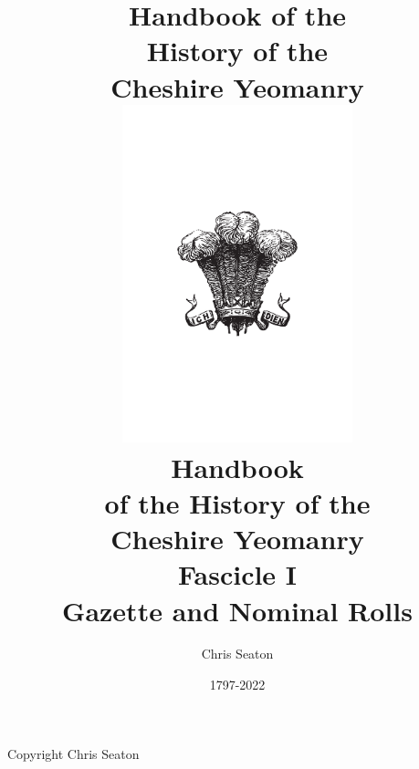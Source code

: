 \documentclass[a4paper,7pt]{book}
\title{Handbook of the \\ History of the \\ Cheshire Yeomanry}
\author{Chris Seaton}
\date{1797-2022}
\title{
  \includegraphics[width=0.5\textwidth]{front/feathers.pdf} \\
  \vspace{10mm}
  \huge Handbook \\
  \vspace{2mm}
  \Large of the History of the \\
  \Huge Cheshire Yeomanry \\
  \vspace{10mm}
  \Large Fascicle I \\ Gazette and Nominal Rolls
}
\begin{document}
\frontmatter

\maketitle

\vspace*{\fill}

\begin{center}
  Copyright  Chris Seaton
\end{center}

\setcounter{tocdepth}{0}
\tableofcontents{}

\mainmatter


% 
% 

%
% 
\end{document}
